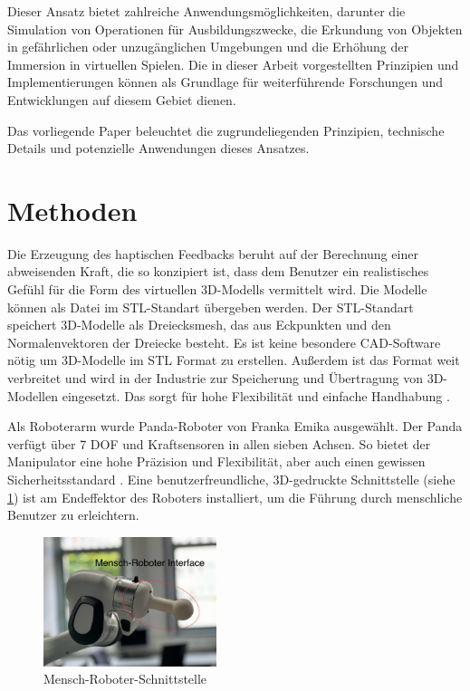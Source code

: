 \documentclass[conference]{IEEEtran}
\begin{document}
Dieser Ansatz bietet zahlreiche Anwendungsmöglichkeiten, darunter die Simulation von Operationen für Ausbildungszwecke, die Erkundung von Objekten in gefährlichen oder unzugänglichen Umgebungen und die Erhöhung der Immersion in virtuellen Spielen. Die in dieser Arbeit vorgestellten Prinzipien und Implementierungen können als Grundlage für weiterführende Forschungen und Entwicklungen auf diesem Gebiet dienen.

Das vorliegende Paper beleuchtet die zugrundeliegenden Prinzipien, technische Details und potenzielle Anwendungen dieses Ansatzes.


\section{Methoden}
Die Erzeugung des haptischen Feedbacks beruht auf der Berechnung einer abweisenden Kraft, die so konzipiert ist, dass dem Benutzer ein realistisches Gefühl für die Form des virtuellen 3D-Modells vermittelt wird. Die Modelle können als Datei im STL-Standart übergeben werden. Der STL-Standart speichert 3D-Modelle als Dreiecksmesh, das aus Eckpunkten und den Normalenvektoren der Dreiecke besteht. Es ist keine besondere CAD-Software nötig um 3D-Modelle im STL Format zu erstellen. Außerdem ist das Format weit verbreitet und wird in der Industrie zur Speicherung und Übertragung von 3D-Modellen eingesetzt. Das sorgt für hohe Flexibilität und einfache Handhabung \autocite{WasIstSTLDatei2017}.

Als Roboterarm wurde Panda-Roboter von Franka Emika ausgewählt. Der Panda verfügt über 7 DOF und Kraftsensoren in allen sieben Achsen. So bietet der Manipulator eine hohe Präzision und Flexibilität, aber auch einen gewissen Sicherheitsstandard \cite{pandaDatasheet}. Eine benutzerfreundliche, 3D-gedruckte Schnittstelle (siehe \ref{fig:MRinterface}) ist am Endeffektor des Roboters installiert, um die Führung durch menschliche Benutzer zu erleichtern.  

\begin{figure}
    \centering
    \includegraphics[width=0.45\textwidth]{pics/interface.jpeg}
    \caption{Mensch-Roboter-Schnittstelle}
    \label{fig:MRinterface}
\end{figure}
\end{document}
